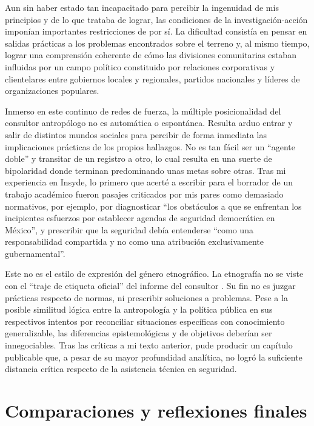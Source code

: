\documentclass[
  spanish,
  11pt,
  a4paper,
]{scrbook}
\begin{document}
Aun sin haber estado tan incapacitado para percibir la ingenuidad de mis
principios y de lo que trataba de lograr, las condiciones de la
investigación-acción imponían importantes restricciones de por sí. La
dificultad consistía en pensar en salidas prácticas a los problemas
encontrados sobre el terreno y, al mismo tiempo, lograr una comprensión
coherente de cómo las divisiones comunitarias estaban influidas por un
campo político constituido por relaciones corporativas y clientelares
entre gobiernos locales y regionales, partidos nacionales y líderes de
organizaciones populares.

Inmerso en este continuo de redes de fuerza, la múltiple posicionalidad
del consultor antropólogo no es automática o espontánea. Resulta arduo
entrar y salir de distintos mundos sociales para percibir de forma
inmediata las implicaciones prácticas de los propios hallazgos. No es
tan fácil ser un ``agente doble'' y transitar de un registro a otro, lo
cual resulta en una suerte de bipolaridad donde terminan predominando
unas metas sobre otras. Tras mi experiencia en Insyde, lo primero que
acerté a escribir para el borrador de un trabajo académico fueron
pasajes criticados por mis pares como demasiado normativos, por ejemplo,
por diagnosticar ``los obstáculos a que se enfrentan los incipientes
esfuerzos por establecer agendas de seguridad democrática en México'', y
prescribir que la seguridad debía entenderse ``como una responsabilidad
compartida y no como una atribución exclusivamente gubernamental''.

Este no es el estilo de expresión del género etnográfico. La etnografía
no se viste con el ``traje de etiqueta oficial'' del informe del
consultor \autocite[942]{Mosse2006}. Su fin no es juzgar prácticas
respecto de normas, ni prescribir soluciones a problemas. Pese a la
posible similitud lógica entre la antropología y la política pública en
sus respectivos intentos por reconciliar situaciones específicas con
conocimiento generalizable, las diferencias epistemológicas y de
objetivos deberían ser innegociables. Tras las críticas a mi texto
anterior, pude producir un capítulo publicable
\autocite{AgudoSanchiz2014} que, a pesar de su mayor profundidad
analítica, no logró la suficiente distancia crítica respecto de la
asistencia técnica en seguridad.

\section*{Comparaciones y reflexiones
finales}\label{comparaciones-y-reflexiones-finales}
\end{document}
